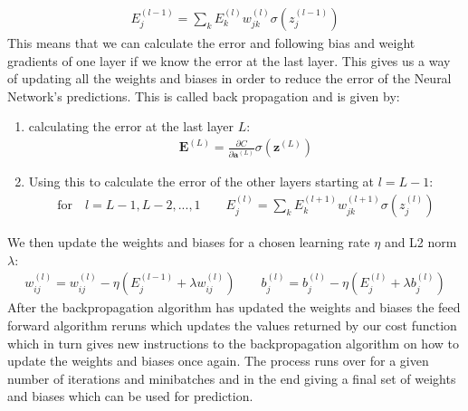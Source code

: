 \documentclass[11pt]{article}
\begin{document}
\begin{align*}
  E^{(l-1)}_j = \sum_k E^{(l)}_k w_{jk}^{(l)}\sigma(z_j^{(l-1)})
\end{align*}
This means that we can calculate the error and following bias and weight gradients of one layer if we know the error at the last layer. This gives us a way of updating all the weights and biases in order to reduce the error of the Neural Network's predictions. This is called back propagation and is given by:
\begin{enumerate}
  \item calculating the error at the last layer $L$:
        \begin{align*}
          \boldsymbol{E}^{(L)} = \frac{\partial C }{\partial \boldsymbol{a}^{(L)}} \sigma(\boldsymbol{z}^{(L)})
        \end{align*}
  \item Using this to calculate the error of the other layers starting at $l=L-1$:
        \begin{align*}
          \text{for}\quad  l=L-1, L-2,...,1 \quad\quad
          E_j^{(l)} = \sum_k E^{(l+1)}_k w_{jk}^{(l+1)} \sigma(z_j^{(l)})
        \end{align*}
\end{enumerate}
We then update the weights and biases for a chosen learning rate $\eta$ and L2 norm $\lambda$:
\begin{align*}
  w^{(l)}_{ij} = w^{(l)}_{ij} - \eta(E_j^{(l-1)}  + \lambda w_{ij}^{(l)}) \quad\quad b_j^{(l)} = b_j^{(l)} - \eta(E_j^{(l)} + \lambda b_j^{(l)})
\end{align*}
After the backpropagation algorithm has updated the weights and biases the feed forward algorithm reruns which updates the values returned by our cost function which in turn gives new instructions to the backpropagation algorithm on how to update the weights and biases once again. The process runs over for a given number of iterations and minibatches and in the end giving a final set of weights and biases which can be used for prediction.
\end{document}
